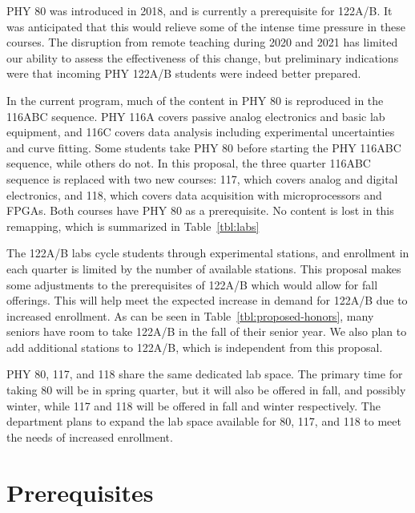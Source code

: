 \documentclass[12pt]{article}
\begin{document}
PHY 80 was introduced in 2018, and is currently a prerequisite for
122A/B.  It was anticipated that this would relieve some of the
intense time pressure in these courses.  The disruption from remote
teaching during 2020 and 2021 has limited our ability to assess the
effectiveness of this change, but preliminary indications were that
incoming PHY 122A/B students were indeed better prepared.

In the current program, much of the content in PHY 80 is reproduced in
the 116ABC sequence. PHY 116A covers passive analog electronics and
basic lab equipment, and 116C covers data analysis including
experimental uncertainties and curve fitting.  Some students take PHY
80 before starting the PHY 116ABC sequence, while others do not. In
this proposal, the three quarter 116ABC sequence is replaced with two
new courses: 117, which covers analog and digital electronics, and
118, which covers data acquisition with microprocessors and FPGAs.
Both courses have PHY 80 as a prerequisite.  No content is lost in
this remapping, which is summarized in Table~\ref{tbl:labs}

The 122A/B labs cycle students through experimental stations, and
enrollment in each quarter is limited by the number of available
stations.  This proposal makes some adjustments to the prerequisites
of 122A/B which would allow for fall offerings.  This will help meet
the expected increase in demand for 122A/B due to increased
enrollment.  As can be seen in Table~\ref{tbl:proposed-honors}, many
seniors have room to take 122A/B in the fall of their senior year.  We
also plan to add additional stations to 122A/B, which is independent
from this proposal.

PHY 80, 117, and 118 share the same dedicated lab space.  The primary
time for taking 80 will be in spring quarter, but it will also be
offered in fall, and possibly winter, while 117 and 118 will be
offered in fall and winter respectively.  The department plans to
expand the lab space available for 80, 117, and 118 to meet the needs
of increased enrollment.

\section{Prerequisites}
\end{document}
